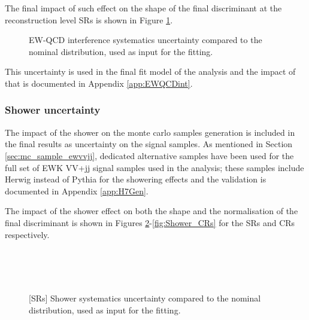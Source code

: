 The final impact of such effect on the shape of the final discriminant at the reconstruction level
SRs is shown in Figure \ref{fig:EWQCDinput_bis}.

\begin{figure}[ht]
    \centering
     \caption{EW-QCD interference systematics uncertainty compared to the nominal distribution, used as input for the fitting.}
     \label{fig:EWQCDinput_bis}
\end{figure}

This uncertainty is used in the final fit model of the analysis 
and the impact of that is documented in Appendix \ref{app:EWQCDint}.



\clearpage
\subsubsection{Shower uncertainty}
\label{subsec:sig_uncer_shower}

The impact of the shower on the monte carlo samples generation is included in the final results
as uncertainty on the signal samples.
As mentioned in Section \ref{sec:mc_sample_ewvvjj}, 
dedicated alternative samples have been used for the full set of EWK VV+jj signal samples 
used in the analysis; these samples include Herwig instead of Pythia for the showering effects
and the validation is documented in Appendix \ref{app:H7Gen}.

The impact of the shower effect on both the shape and the normalisation
of the final discriminant is shown in Figures \ref{fig:Shower_SRs}-\ref{fig:Shower_CRs}
for the SRs and CRs respectively.

\begin{figure}[ht]
    \centering
      \\
      \\
      \\
     \caption{[SRs] Shower systematics uncertainty compared to the nominal distribution, used as input for the fitting.}
     \label{fig:Shower_SRs}
\end{figure}

